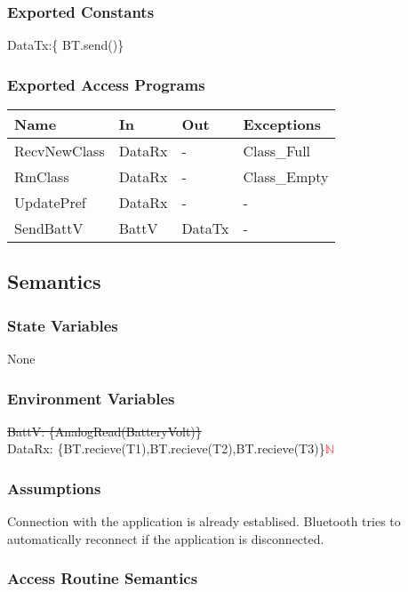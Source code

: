 \documentclass[12pt, titlepage]{article}
\begin{document}
\subsubsection{Exported Constants}
DataTx:\{ BT.send()\} 
\subsubsection{Exported Access Programs}

\begin{center}
\begin{tabular}{p{3cm} p{4cm} p{3cm} p{3cm}}
\hline
\textbf{Name} & \textbf{In} & \textbf{Out} & \textbf{Exceptions} \\
\hline
RecvNewClass & DataRx & - & Class\_Full \\
\hline
RmClass & DataRx & - & Class\_Empty \\
\hline
UpdatePref & DataRx & - & - \\
\hline
SendBattV & BattV & DataTx & - \\
\hline

\end{tabular}
\end{center}

\subsection{Semantics}

\subsubsection{State Variables}

None
\subsubsection{Environment Variables}

\sout{BattV: \{AnalogRead(BatteryVolt)\}}\\ 
DataRx: \{BT.recieve(T1),BT.recieve(T2),BT.recieve(T3)\}\textcolor{red}{$\mathbb{N}$}

\subsubsection{Assumptions}

Connection with the application is already establised. Bluetooth tries to automatically reconnect if the application is disconnected. 

\subsubsection{Access Routine Semantics}
\end{document}
